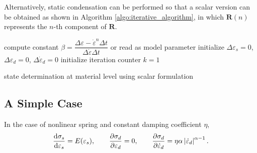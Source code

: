 Alternatively, static condensation can be performed so that a scalar version can be obtained as shown in Algorithm \ref{algo:iterative_algorithm}, in which $\mathbold{R}(n)$ represents the $n$-th component of $\mathbold{R}$.
\begin{algorithm}[htb]\onehalfspacing
{}
compute constant $\beta=\dfrac{\Delta\varepsilon-\dot\varepsilon^n\Delta{}t}{\Delta\dot\varepsilon\Delta{}t}$ or read as model parameter\;
initialize $\Delta\varepsilon_s=0$, $\Delta\varepsilon_d=0$, $\Delta\dot\varepsilon_d=0$\;
initialize iteration counter $k=1$\;
\caption{state determination at material level using scalar formulation}\label{algo:iterative_algorithm}
\end{algorithm}
\subsection{A Simple Case}
In the case of nonlinear spring and constant damping coefficient $\eta$,
\begin{gather}
\dfrac{\mathrm{d}\sigma_s}{\mathrm{d}\varepsilon_s}=E(\varepsilon_s),\qquad\dfrac{\partial\sigma_d}{\partial\varepsilon_d}=0,\qquad\dfrac{\partial\sigma_d}{\partial\dot\varepsilon_d}=\eta\alpha\left\lvert\dot\varepsilon_d\right\rvert^{\alpha-1}.
\end{gather}

